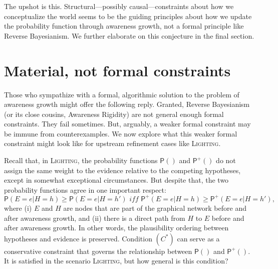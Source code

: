 \documentclass[
  11pt,
  dvipsnames,enabledeprecatedfontcommands]{scrartcl}
\newcommand{\pr}[1]{\ensuremath{\mathsf{P}(#1)}}
\newcommand{\ppr}[2]{\ensuremath{\mathsf{P}^{#1}(#2)}}
\begin{document}
The upshot is this. Structural---possibly causal---constraints about how
we conceptualize the world seems to be the guiding principles about how
we update the probability function through awareness growth, not a
formal principle like Reverse Bayesianism. We further elaborate on this
conjecture in the final section.

\hypertarget{material-not-formal-constraints}{%
\section{Material, not formal
constraints}\label{material-not-formal-constraints}}

\label{sec:material}

Those who sympathize with a formal, algorithmic solution to the problem
of awareness growth might offer the following reply. Granted, Reverse
Bayesianism (or its close cousins, Awareness Rigidity) are not general
enough formal constraints. They fail sometimes. But, arguably, a weaker
formal constraint may be immune from counterexamples. We now explore
what this weaker formal constraint might look like for upstream
refinement cases like \textsc{Lighting}.

Recall that, in \textsc{Lighting}, the probability functions \(\pr{}\)
and \(\ppr{+}{}\) do not assign the same weight to the evidence relative
to the competing hypotheses, except in somewhat exceptional
circumstances. But despite that, the two probability functions agree in
one important respect:
\[\pr{E=e \vert H=h} \geq \pr{E=e \vert H=h'} \textit{ iff } \ppr{+}{E=e \vert H=h} \geq \ppr{+}{E=e \vert H=h'} \tag{$C^*$},\]
where (i) \(E\) and \(H\) are nodes that are part of the graphical
network before and after awareness growth, and (ii) there is a direct
path from \(H\) to \(E\) before and after awareness
growth. In other words,
the plausibility ordering between hypotheses and evidence is preserved.
Condition \((C^*)\) can serve as a conservative constraint that governs
the relationship between \(\pr{}\) and \(\ppr{+}{}\). It is satisfied in
the scenario \textsc{Lighting}, but how general is this condition?
\end{document}

